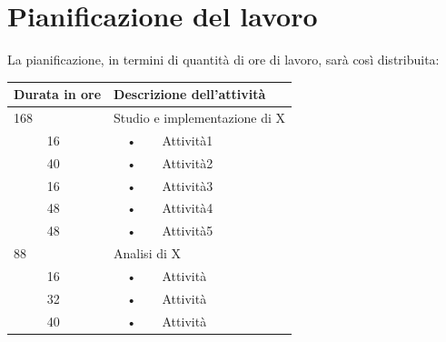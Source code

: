 \documentclass[11pt,notitlepage]{article}
\begin{document}
\bigskip
\section*{Pianificazione del lavoro}
La pianificazione, in termini di quantità di ore di lavoro, sarà così distribuita:

\begin{center}
	
\begin{tabular}{|l|l|c l|}
	\hline
	\multicolumn{2}{|l|}{\textbf{Durata in ore}}		&	\multicolumn{2}{l|}{\textbf{Descrizione dell'attività}}\\
	\hline
	\multicolumn{2}{|l|}{168}	&	\multicolumn{2}{l|}{Studio e implementazione di X}\\
	\hline
	\multirow{5}{1cm}{ }    &            16            &            \hspace{5mm}•\hspace{2mm}            &       Attività1\\
	\cline{2-2}
	&            40            &           \hspace{5mm}•\hspace{2mm}         &           Attività2\\
	\cline{2-2}
	&            16            &            \hspace{5mm}•\hspace{2mm}            &            Attività3\\
	\cline{2-2}
	&            48            &            \hspace{5mm}•\hspace{2mm}            &            Attività4\\
	\cline{2-2}
	&            48            &         \hspace{5mm}•\hspace{2mm}           &            Attività5\\
	\hline
	
	\multicolumn{2}{|l|}{88}	&	\multicolumn{2}{l|}{Analisi di X}\\
	\hline
	
	\multirow{3}{1cm}{ }    &            16            &            \hspace{5mm}•\hspace{2mm}            &       Attività\\
	\cline{2-2}
	&            32            &            \hspace{5mm}•\hspace{2mm}            &            Attività\\
	\cline{2-2}
	&            40            &         \hspace{5mm}•\hspace{2mm}           &            Attività\\
	\hline
	

\end{tabular}
\end{center}
\end{document}

